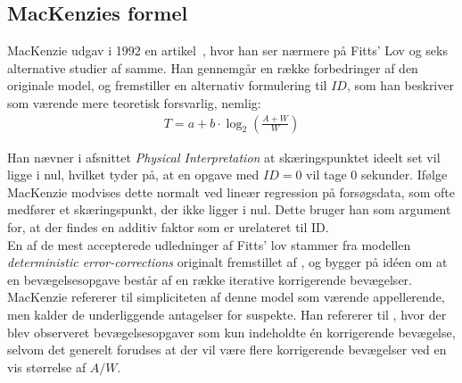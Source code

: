 \subsection*{MacKenzies formel}
MacKenzie udgav i 1992 en artikel~\cite{mackenzie1992}, hvor han ser nærmere på Fitts' Lov og seks alternative studier af samme. Han gennemgår en række forbedringer af den originale model, og fremstiller en alternativ formulering til $ID$, som han beskriver som værende mere teoretisk forsvarlig, nemlig:
\begin{align}
T=a+b\cdot\log_2\left({\frac{A+W}{W}}\right)
\end{align}

Han nævner i afsnittet \emph{Physical Interpretation} at skæringspunktet ideelt set vil ligge i nul, hvilket tyder på, at en opgave med $ID=0$ vil tage 0 sekunder. Ifølge MacKenzie modvises dette normalt ved lineær regression på forsøgsdata, som ofte medfører et skæringspunkt, der ikke ligger i nul. Dette bruger han som argument for, at der findes en additiv faktor som er urelateret til ID.\\

En af de mest accepterede udledninger af Fitts' lov stammer fra modellen \emph{deterministic error-corrections} originalt fremstillet af \cite{crossman1983}, og bygger på idéen om at en bevægelsesopgave består af en række iterative korrigerende bevægelser. MacKenzie refererer til simpliciteten af denne model som værende appellerende, men kalder de underliggende antagelser for suspekte. Han refererer til \cite{langolf1976}, hvor der blev observeret bevægelsesopgaver som kun indeholdte én korrigerende bevægelse, selvom det generelt forudses at der vil være flere korrigerende bevægelser ved en vis størrelse af $A/W$.\\


